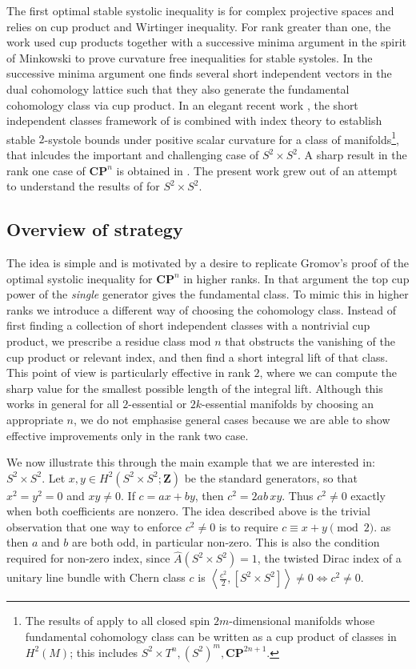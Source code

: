 \documentclass[11pt,reqno]{amsart}
\numberwithin{equation}{section}
\numberwithin{equation}{section}
\theoremstyle{definition}
\newcommand{\Z}{\mathbf Z}
\newcommand{\CP}{\mathbf{CP}}
\newcommand{\Ah}{\widehat A}
\newcommand{\ip}[2]{\left\langle #1,#2\right\rangle}
\begin{document}
The first optimal stable systolic inequality is for complex projective spaces \cite[Section 4.4]{gromov-metric} and relies on cup product and Wirtinger inequality. For rank greater than one, the work \cite{bangert-katz} used cup products together with a successive minima argument in the spirit of Minkowski to prove curvature free inequalities for stable systoles. In the successive minima argument one finds several short independent vectors in the dual cohomology lattice such that they also generate the fundamental cohomology class via cup product. In an elegant recent work \cite{Stryker}, the short independent classes framework of \cite{GHK} is combined with index theory to establish stable \(2\)-systole bounds under positive scalar curvature for a class of manifolds\footnote{The results of \cite{Stryker} apply to all closed spin $2m$-dimensional manifolds whose fundamental cohomology class can be written as a cup product of classes in $H^2(M)$; this includes $S^2 \times T^n, (S^2)^m, \CP^{2n+1}$.}, that inlcudes the important and challenging case of \(S^2\times S^2\). A sharp result in the rank one case of $\CP^n$ is obtained in \cite{CHZ}. The present work grew out of an attempt to understand the results of \cite{Stryker} for \(S^2\times S^2\). 

\subsection{Overview of strategy} The idea is simple and is motivated by a desire to replicate Gromov's proof of the optimal systolic inequality for $\CP^n$ in higher ranks. In that argument the top cup power of the \textit{single} generator gives the fundamental class. To mimic this in higher ranks we introduce a different way of choosing the cohomology class. Instead of first finding a collection of short independent classes\cite{bangert-katz,GHK} with a nontrivial cup product, we prescribe a residue class mod \(n\) that obstructs the vanishing of the cup product or relevant index, and then find a short integral lift of that class. This point of view is particularly effective in rank \(2\), where we can compute the sharp value for the smallest possible length of the integral lift. Although this works in general for all \(2\)-essential or \(2k\)-essential manifolds by choosing an appropriate \(n\), we do not emphasise general cases because we are able to show effective improvements only in the rank two case. 

We now illustrate this through the main example that we are interested in: \(S^2\times S^2\). Let \(x,y\in H^2(S^2\times S^2;\Z)\) be the standard generators, so that \(x^2=y^2=0\) and \(xy\neq0\). If \(c=ax+by\), then \(c^2=2ab\,xy\). Thus \(c^2\neq0\) exactly when both coefficients are nonzero. The idea described above is the trivial observation that one way to enforce $c^2 \neq 0$ is to require \(c\equiv x+y \pmod 2.\) as then \(a\) and \(b\) are both odd, in particular non-zero. This is also the condition required for non-zero index, since \(\Ah(S^2\times S^2)=1\), the twisted Dirac index of a unitary line bundle with Chern class \(c\) is \(\ip{\frac{c^2}{2}}{[S^2\times S^2]} \neq 0 \Leftrightarrow c^2 \neq 0.\) 
\end{document}
